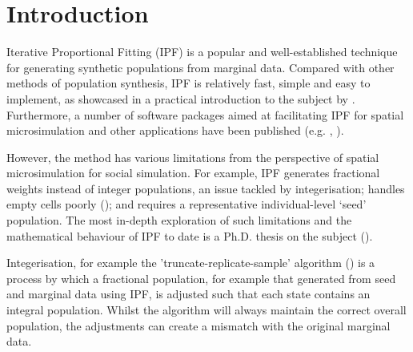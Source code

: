 \documentclass{JASSS}
\begin{document}



\section{Introduction}\label{introduction}

Iterative Proportional Fitting (IPF) is a popular and well-established
technique for generating synthetic populations from marginal data.
Compared with other methods of population synthesis, IPF is relatively
fast, simple and easy to implement, as showcased in a practical
introduction to the subject by \cite{lovelace_spatial_2016}. Furthermore,
a number of software packages aimed at facilitating IPF for spatial
microsimulation and other applications have been published (e.g.
\cite{barthelemy_cran_2016}, \cite{jones_raker:_2016}).

However, the method has various limitations from the perspective of
spatial microsimulation for social simulation. For example, IPF
generates fractional weights instead of integer populations, an issue
tackled by integerisation; handles empty cells poorly (\cite{lovelace_evaluating_2015}); and requires a representative individual-level `seed' population. The most in-depth exploration of such limitations and the mathematical behaviour of IPF to date is a Ph.D. thesis on the subject (\cite{zaloznik_iterative_2011}).

Integerisation, for example the 'truncate-replicate-sample' algorithm (\cite{lovelace_truncate_2013}) is a process by which a fractional population, for example that generated from seed and marginal data using IPF, is adjusted such that each state contains an integral population. Whilst the algorithm will always maintain the correct overall population, the adjustments can create a mismatch with the original marginal data.
\end{document}

